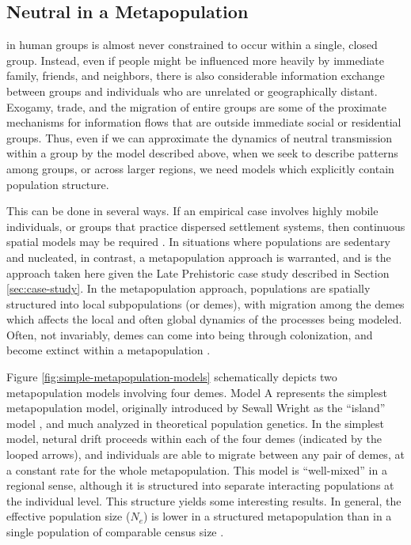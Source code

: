 \subsection{Neutral \CT in a Metapopulation}
\label{sec:metapopulation-neutral-ct}

\Ct in human groups is almost never constrained to occur within a single, closed group.  Instead, even if people might be influenced more heavily by immediate family, friends, and neighbors, there is also considerable information exchange between groups and individuals who are unrelated or geographically distant.  Exogamy, trade, and the migration of entire groups are some of the proximate mechanisms for information flows that are outside immediate social or residential groups.  Thus, even if we can approximate the dynamics of neutral transmission within a group by the model described above, when we seek to describe patterns among groups, or across larger regions, we need models which explicitly contain population structure.

This can be done in several ways.  If an empirical case involves highly mobile individuals, or groups that practice dispersed settlement systems, then continuous spatial models may be required \cite[e.g.][]{kandler2009innovation,kandler2009investigation}.  In situations where populations are sedentary and nucleated, in contrast, a metapopulation approach is warranted, and is the approach taken here given the Late Prehistoric case study described in Section \ref{sec:case-study}.  In the metapopulation approach, populations are spatially structured into local subpopulations (or demes), with migration among the demes which affects the local and often global dynamics of the processes being modeled.  Often, not invariably, demes can come into being through colonization, and become extinct within a metapopulation \citep[see papers in ][for an introduction to the diversity of metapopulation model applications]{hanski1997metapopulation}.



Figure \ref{fig:simple-metapopulation-models} schematically depicts two metapopulation models involving four demes.  Model A represents the simplest metapopulation model, originally introduced by Sewall Wright as the ``island'' model \citep{Wright1943}, and much analyzed in theoretical population genetics.  In the simplest model, netural drift proceeds within each of the four demes (indicated by the looped arrows), and individuals are able to migrate between any pair of demes, at a constant rate for the whole metapopulation.  This model is ``well-mixed'' in a regional sense, although it is structured into separate interacting populations at the individual level.  This structure yields some interesting results.  In general, the effective population size ($N_e$) is lower in a structured metapopulation than in a single population of comparable census size \citep{barton1997evolution}.  


